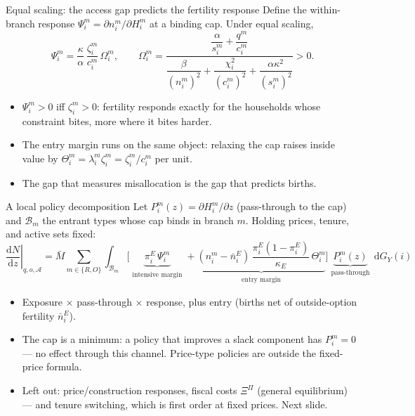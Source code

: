 \documentclass[11pt,aspectratio=169]{beamer}
\newcommand{\dd}{\mathrm d}
\newcommand{\1}{\mathbf 1}
\newcommand{\Mbar}{\bar M}
\begin{document}
\begin{frame}{Equal scaling: the access gap predicts the fertility response}
\small
Define the within-branch response $\Psi_i^m=\partial n_i^m/\partial H_i^m$ at a binding cap. Under equal scaling,
\[
\Psi_i^m
=
\frac{\kappa}{\alpha}\,
\frac{\zeta_i^m}{c_i^m}\,
\Omega_i^m,
\qquad
\Omega_i^m=
\frac{\dfrac{\alpha}{s_i^m}+\dfrac{q^m}{c_i^m}}
{\dfrac{\beta}{(n_i^m)^2}+\dfrac{\chi_i^2}{(c_i^m)^2}+\dfrac{\alpha\kappa^2}{(s_i^m)^2}}
>0 .
\]
\begin{itemize}\setlength{\itemsep}{0.4em}
  \item $\Psi_i^m>0$ iff $\zeta_i^m>0$: fertility responds exactly for the households whose constraint bites, more where it bites harder.
  \item The entry margin runs on the same object: relaxing the cap raises inside value by $\Theta_i^m=\lambda_i^m\zeta_i^m=\zeta_i^m/c_i^m$ per unit.
  \item The gap that measures misallocation is the gap that predicts births.
\end{itemize}
\end{frame}

\begin{frame}{A local policy decomposition}
\small
Let $P_i^m(z)=\partial H_i^m/\partial z$ (pass-through to the cap) and $\mathcal B_m$ the entrant types whose cap binds in branch $m$. Holding prices, tenure, and active sets fixed:
{\footnotesize
\[
\left.\frac{\dd N}{\dd z}\right|_{q,o,\mathcal A}
=
\Mbar\sum_{m\in\{R,O\}}\int_{\mathcal B_m}
\Bigg[
\underbrace{\pi_i^E\,\Psi_i^m}_{\substack{\text{intensive margin}}}
+
\underbrace{(n_i^m-\bar n_i^E)\,\frac{\pi_i^E(1-\pi_i^E)}{\kappa_E}\,\Theta_i^m}_{\substack{\text{entry margin}}}
\Bigg]
\underbrace{P_i^m(z)}_{\substack{\text{pass-through}}}
\,\dd G_Y(i)
\]}
\begin{itemize}\setlength{\itemsep}{0.35em}
  \item Exposure $\times$ pass-through $\times$ response, plus entry (births net of outside-option fertility $\bar n_i^E$).
  \item The cap is a minimum: a policy that improves a slack component has $P_i^m=0$ --- no effect through this channel. Price-type policies are outside the fixed-price formula.
  \item Left out: price/construction responses, fiscal costs $\Xi^\Pi$ (general equilibrium) --- and tenure switching, which is first order at fixed prices. Next slide.
\end{itemize}
\end{frame}
\end{document}
